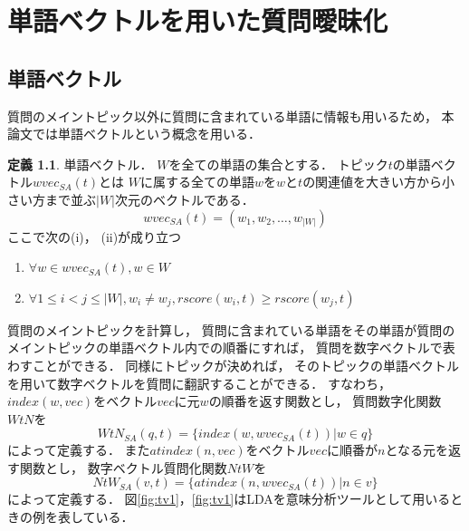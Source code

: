 \documentclass[master]{suribt}
\theoremstyle{definition}
\newtheorem{defi}[thm]{定義}
\begin{document}
 \chapter{単語ベクトルを用いた質問曖昧化}

 \section{単語ベクトル}
 質問のメイントピック以外に質問に含まれている単語に情報も用いるため，
 本論文では単語ベクトルという概念を用いる．
 
 \begin{defi}{単語ベクトル．}
 $W$を全ての単語の集合とする．
 トピック$t$の単語ベクトル$wvec_{SA}(t)$とは
 $W$に属する全ての単語$w$を$w$と$t$の関連値を大きい方から小さい方まで並ぶ$|W|$次元のベクトルである．
 \begin{equation}
  wvec_{SA}(t)  = (w_1,w_2, \dots , w_{|W|})
 \end{equation}
 ここで次の(i)， (ii)が成り立つ
 \begin{enumerate}
 \renewcommand{\labelenumi}{(\roman{enumi})}
 \item $\forall w \in wvec_{SA}(t), w \in W$ 
 \item $\forall 1 \leq i < j \leq |W|,w_i \neq w_j,rscore(w_i,t) \geq rscore(w_j,t)$
 \end{enumerate}
 \end{defi}

 質問のメイントピックを計算し，
 質問に含まれている単語をその単語が質問のメイントピックの単語ベクトル内での順番にすれば，
 質問を数字ベクトルで表わすことができる．
 同様にトピックが決めれば，
 そのトピックの単語ベクトルを用いて数字ベクトルを質問に翻訳することができる．
 すなわち，$index(w,vec)$をベクトル$vec$に元$w$の順番を返す関数とし，
 質問数字化関数$WtN$を
 \begin{equation}
  WtN_{SA}(q,t)  = \{index(w,wvec_{SA}(t))| w \in q\}
 \end{equation}
 によって定義する．
 また$atindex(n,vec)$をベクトル$vec$に順番が$n$となる元を返す関数とし，
 数字ベクトル質問化関数$NtW$を
 \begin{equation}
  NtW_{SA}(v,t)  = \{atindex(n,wvec_{SA}(t))| n \in v\}
 \end{equation}
 によって定義する．
 図\ref{fig:tv1}，\ref{fig:tv1}はLDAを意味分析ツールとして用いるときの例を表している．
\end{document}
